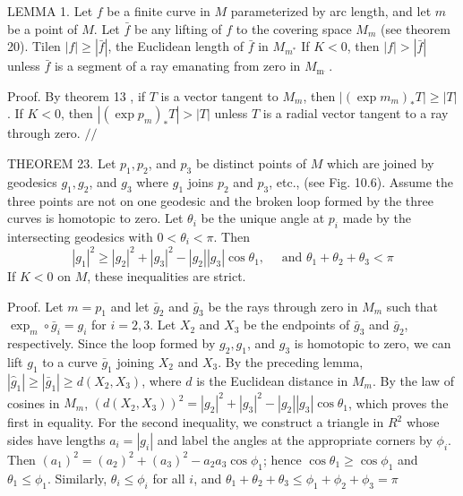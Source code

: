 \documentclass[10pt]{article}
\begin{document}
LEMMA 1. Let $f$ be a finite curve in $M$ parameterized by arc length, and let $m$ be a point of $M$. Let $\bar{f}$ be any lifting of $f$ to the covering space $M_{m}$ (see theorem 20). Tilen $|f| \geq|\bar{f}|$, the Euclidean length of $\bar{f}$ in $M_{m^{*}}$ If $K<0$, then $|f|>|\bar{f}|$ unless $\bar{f}$ is a segment of a ray emanating from zero in $M_{\mathrm{m}^{\text {. }}}$.

Proof. By theorem 13 , if $T$ is a vector tangent to $M_{m}$, then $\left|\left(\exp m_{m}\right)_{*} T\right| \geq|T|$. If $K<0$, then $\left|\left(\exp p_{m}\right)_{*} T\right|>|T|$ unless $T$ is a radial vector tangent to a ray through zero. $/ /$

THEOREM 23. Let $p_{1}, p_{2}$, and $p_{3}$ be distinct points of $M$ which are joined by geodesics $g_{1}, g_{2}$, and $g_{3}$ where $g_{1}$ joins $p_{2}$ and $p_{3}$, etc., (see Fig. 10.6). Assume the three points are not on one geodesic and the broken loop formed by the three curves is homotopic to zero. Let $\theta_{i}$ be the unique angle at $p_{i}$ made by the intersecting geodesics with $0<\theta_{i}<\pi .$ Then
$$
\left|g_{1}\right|^{2} \geq\left|g_{2}\right|^{2}+\left|g_{3}\right|^{2}-\left|g_{2}\right|\left|g_{3}\right| \cos \theta_{1}, \quad \text { and } \theta_{1}+\theta_{2}+\theta_{3}<\pi
$$
If $K<0$ on $M$, these inequalities are strict.

Proof. Let $m=p_{1}$ and let $\bar{g}_{2}$ and $\bar{g}_{3}$ be the rays through zero in $M_{m}$ such that $\exp _{m} \circ \bar{g}_{i}=g_{i}$ for $i=2,3$. Let $X_{2}$ and $X_{3}$ be the endpoints of $\bar{g}_{3}$ and $\bar{g}_{2}$, respectively. Since the loop formed by $g_{2}, g_{1}$, and $g_{3}$ is homotopic to zero, we can lift $g_{1}$ to a curve $\bar{g}_{1}$ joining $X_{2}$ and $X_{3} .$ By the preceding lemma, $\left|\hat{g}_{1}\right| \geq\left|\bar{g}_{1}\right| \geq d\left(X_{2}, X_{3}\right)$, where $d$ is the Euclidean distance in $M_{m}$. By the law of cosines in $M_{m}$, $\left(d\left(X_{2}, X_{3}\right)\right)^{2}=\left|g_{2}\right|^{2}+\left|g_{3}\right|^{2}-\left|g_{2}\right|\left|g_{3}\right| \cos \theta_{1}$, which proves the first in equality. For the second inequality, we construct a triangle in $R^{2}$ whose sides have lengths $a_{i}=\left|g_{i}\right|$ and label the angles at the appropriate corners by $\phi_{i}$. Then $\left(a_{1}\right)^{2}=\left(a_{2}\right)^{2}+\left(a_{3}\right)^{2}-a_{2} a_{3} \cos \phi_{1}$; hence $\cos \theta_{1} \geq \cos \phi_{1}$ and $\theta_{1} \leq \phi_{1}$. Similarly, $\theta_{i} \leq \phi_{i}$ for all $i$, and $\theta_{1}+\theta_{2}+\theta_{3} \leq \phi_{1}+\phi_{2}+\phi_{3}=\pi$
\end{document}
